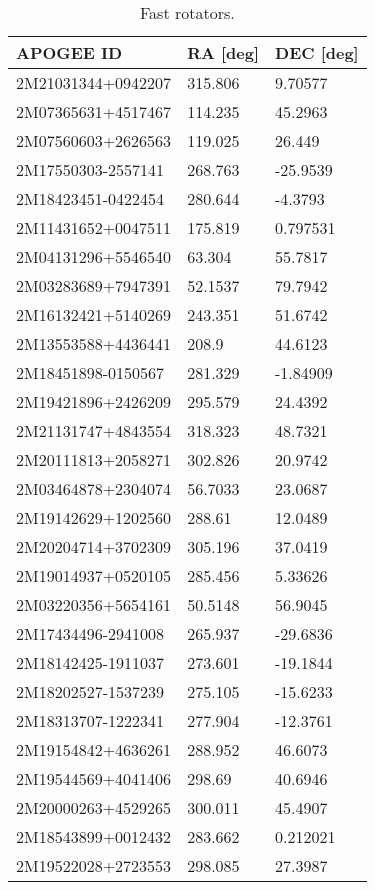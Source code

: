 \documentclass[fleqn,usenatbib]{mnras}
\begin{document}
\begin{table*}
\centering
  \begin{tabular}{lll}
  \toprule
  APOGEE ID  &       RA [deg] &       DEC [deg]                                     \\
  \midrule
2M21031344+0942207 &  315.806 &   9.70577 \\
2M07365631+4517467 &  114.235 &   45.2963 \\
2M07560603+2626563 &  119.025 &    26.449 \\
2M17550303-2557141 &  268.763 &  -25.9539 \\
2M18423451-0422454 &  280.644 &   -4.3793 \\
2M11431652+0047511 &  175.819 &  0.797531 \\
2M04131296+5546540 &   63.304 &   55.7817 \\
2M03283689+7947391 &  52.1537 &   79.7942 \\
2M16132421+5140269 &  243.351 &   51.6742 \\
2M13553588+4436441 &    208.9 &   44.6123 \\
2M18451898-0150567 &  281.329 &  -1.84909 \\
2M19421896+2426209 &  295.579 &   24.4392 \\
2M21131747+4843554 &  318.323 &   48.7321 \\
2M20111813+2058271 &  302.826 &   20.9742 \\
2M03464878+2304074 &  56.7033 &   23.0687 \\
2M19142629+1202560 &   288.61 &   12.0489 \\
2M20204714+3702309 &  305.196 &   37.0419 \\
2M19014937+0520105 &  285.456 &   5.33626 \\
2M03220356+5654161 &  50.5148 &   56.9045 \\
2M17434496-2941008 &  265.937 &  -29.6836 \\
2M18142425-1911037 &  273.601 &  -19.1844 \\
2M18202527-1537239 &  275.105 &  -15.6233 \\
2M18313707-1222341 &  277.904 &  -12.3761 \\
2M19154842+4636261 &  288.952 &   46.6073 \\
2M19544569+4041406 &   298.69 &   40.6946 \\
2M20000263+4529265 &  300.011 &   45.4907 \\
2M18543899+0012432 &  283.662 &  0.212021 \\
2M19522028+2723553 &  298.085 &   27.3987 \\
  \bottomrule
  \end{tabular}
  \caption{Fast rotators.}
  \label{tab:broad}
\end{table*}
\end{document}
